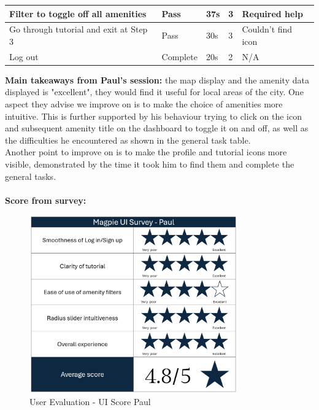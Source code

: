 \begin{table}[h!]
\begin{tabular}{|p{}|p{}|p{}|p{}|p{}|}
        \hline
        Filter to toggle off all amenities            & Pass            & 37s                 & 3                   & Required help      \\
        \hline
        Go through tutorial and exit at Step 3        & Pass            & 30s                 & 3                   & Couldn't find icon \\
        \hline
        Log out                                       & Complete        & 20s                 & 2                   & N/A                \\
        \hline
    \end{tabular}
\end{table}
\textbf{Main takeaways from Paul's session: }the map display and the amenity data displayed is "excellent", they would find it useful for local areas of the city. One aspect they advise we improve on is to make the choice of amenities more intuitive. This is further supported by his behaviour trying to click on the icon and subsequent amenity title on the dashboard to toggle it on and off, as well as the difficulties he encountered as shown in the general task table.\\
Another point to improve on is to make the profile and tutorial icons more visible, demonstrated by the time it took him to find them and complete the general tasks.\\\\
\textbf{Score from survey: }
\begin{figure}
    \centering
    \includegraphics[width=0.8\textwidth]{images/survey-paul.png}
    \caption{User Evaluation - UI Score Paul}
\end{figure}


